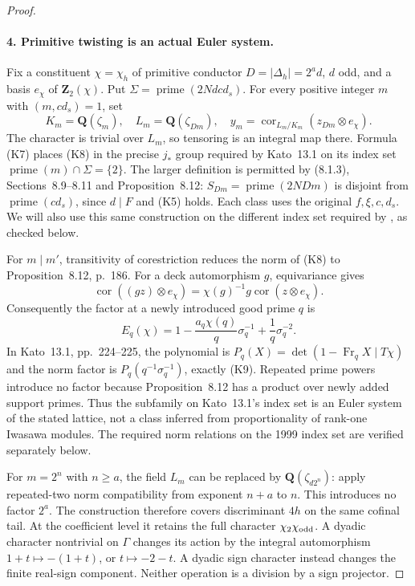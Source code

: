 \begin{proof}
\paragraph{4. Primitive twisting is an actual Euler system.}
Fix a constituent $\chi=\chi_h$ of primitive conductor
$D=|\Delta_h|=2^a d$, $d$ odd, and a basis $e_\chi$ of
$\mathbf Z_2(\chi)$. Put
$\Sigma=\operatorname{prime}(2Ndcd_s)$.
For every positive integer $m$ with $(m,cd_s)=1$, set
\[
 K_m=\mathbf Q(\zeta_m),\quad
 L_m=\mathbf Q(\zeta_{Dm}),\quad
 y_m=\operatorname{cor}_{L_m/K_m}
             (z_{Dm}\otimes e_\chi).                      \tag{K8}
\]
The character is trivial over $L_m$, so tensoring is an integral
map there. Formula (K7) places (K8) in the precise $j_*$ group
required by Kato~13.1 on its index set
$\operatorname{prime}(m)\cap\Sigma=\{2\}$. The larger definition is
permitted by (8.1.3), Sections~8.9--8.11 and Proposition~8.12:
$S_{Dm}=\operatorname{prime}(2NDm)$ is disjoint from
$\operatorname{prime}(cd_s)$, since $d\mid F$ and (K5) holds.
Each class uses the original $f,\xi,c,d_s$. We will also use this
same construction on the different index set required by
\cite[Section 0.1]{kato1999}, as checked below.

For $m\mid m'$, transitivity of corestriction reduces the norm
of (K8) to Proposition~8.12, p.~186. For a deck automorphism $g$,
equivariance gives
\[
 \operatorname{cor}((gz)\otimes e_\chi)
       =\chi(g)^{-1}g\operatorname{cor}(z\otimes e_\chi).
\]
Consequently the factor at a newly introduced good prime $q$ is
\[
 E_q(\chi)=1-\frac{a_q\chi(q)}q\sigma_q^{-1}
                         +\frac1q\sigma_q^{-2}.           \tag{K9}
\]
In Kato~13.1, pp.~224--225, the polynomial is
$P_q(X)=\det(1-\operatorname{Fr}_qX\mid T\chi)$ and the norm
factor is $P_q(q^{-1}\sigma_q^{-1})$, exactly (K9).
Repeated prime powers introduce no factor because Proposition~8.12
has a product over newly added support primes. Thus the subfamily
on Kato~13.1's index set is an Euler system of the stated lattice,
not a class inferred from proportionality of rank-one Iwasawa
modules. The required norm relations on the 1999 index set are
verified separately below.

For $m=2^n$ with $n\geq a$, the field $L_m$ can be replaced by
$\mathbf Q(\zeta_{d2^n})$: apply repeated-two norm compatibility
from exponent $n+a$ to $n$. This introduces no factor $2^a$.
The construction therefore covers discriminant $4h$ on the same
cofinal tail. At the coefficient level it retains the full character
$\chi_2\chi_{\rm odd}$. A dyadic character nontrivial on $\Gamma$
changes its action by the integral automorphism
$1+t\mapsto-(1+t)$, or $t\mapsto-2-t$. A dyadic sign character
instead changes the finite real-sign component. Neither operation
is a division by a sign projector.


\end{proof}
